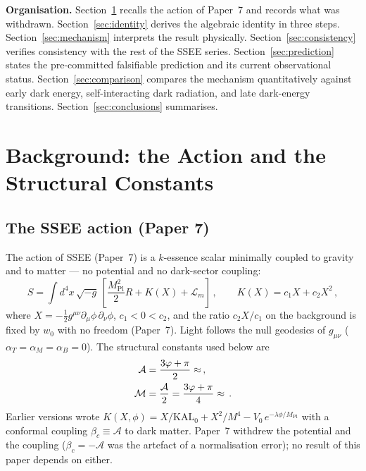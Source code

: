 \documentclass[12pt,a4paper]{article}
\newcommand{\phiG}{\varphi}
\newcommand{\KAL}{\mathrm{KAL}_0}
\newcommand{\MIRA}{\mathcal{M}}
\newcommand{\AURA}{\mathcal{A}}
\newcommand{\Mpl}{M_{\mathrm{Pl}}}
\newcommand{\bc}{\beta_c}
\begin{document}
\bigskip

\noindent\textbf{Organisation.}
Section~\ref{sec:background} recalls the action of Paper~7 and records what was withdrawn.
Section~\ref{sec:identity} derives the algebraic identity in three steps.
Section~\ref{sec:mechanism} interprets the result physically.
Section~\ref{sec:consistency} verifies consistency with the rest of the
SSEE series.
Section~\ref{sec:prediction} states the pre-committed falsifiable prediction
and its current observational status.
Section~\ref{sec:comparison} compares the mechanism quantitatively against
early dark energy, self-interacting dark radiation, and late dark-energy
transitions.
Section~\ref{sec:conclusions} summarises.

\section{Background: the Action and the Structural Constants}
\label{sec:background}

\subsection{The SSEE action (Paper 7)}
\label{sec:p7recap}

The action of SSEE (Paper~7) is a $k$-essence scalar
\citep{ArmendarizPicon1999,ArmendarizPicon2001} minimally
coupled to gravity and to matter --- no potential and no dark-sector coupling:
\begin{equation}
  S = \int d^4x\,\sqrt{-g}\,\left[
      \frac{\Mpl^2}{2}R + K(X) + \mathcal{L}_m
      \right]\,,
  \qquad
  K(X) = c_1 X + c_2 X^2\,,
  \label{eq:action}
\end{equation}
where $X = -\tfrac{1}{2}g^{\mu\nu}\partial_\mu\phi\,\partial_\nu\phi$,
$c_1<0<c_2$, and the ratio $c_2X/c_1$ on the background is fixed by $w_0$ with
no freedom (Paper~7). Light follows the null geodesics of $g_{\mu\nu}$
($\alpha_T=\alpha_M=\alpha_B=0$). The structural constants used below are
\begin{align}
  \AURA &= \frac{3\phiG+\pi}{2} \approx \val{AURA_d3}\,, \label{eq:bc}\\
  \MIRA &= \frac{\AURA}{2} = \frac{3\phiG+\pi}{4} \approx \val{MIRA_d4}\,. \label{eq:MIRA_def}
\end{align}
Earlier versions wrote $K(X,\phi) = X/\KAL + X^2/M^4 - V_0\,e^{-\lambda\phi/\Mpl}$
with a conformal coupling $\bc\equiv\AURA$ to dark matter. Paper~7 withdrew the
potential and the coupling ($\bc=-\AURA$ was the artefact of a normalisation
error); no result of this paper depends on either.
\end{document}
